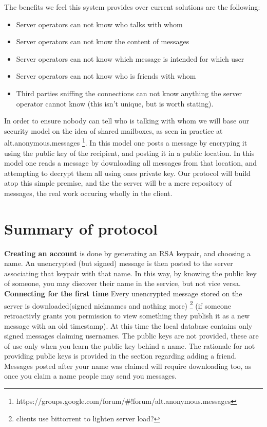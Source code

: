 The benefits we feel this system provides over current solutions are the
following:
\begin{itemize}
\item Server operators can not know who talks with whom
\item Server operators can not know the content of messages
\item Server operators can not know which message is intended for which user
\item Server operators can not know who is friends with whom
\item Third parties sniffing the connections can not know anything the server
operator cannot know (this isn't unique, but is worth stating).
\end{itemize}

In order to ensure nobody can tell who is talking with whom we will base our
security model on the idea of shared mailboxes, as seen in practice at
alt.anonymous.messages
\footnote{https://groups.google.com/forum/\#!forum/alt.anonymous.messages}.
In this model one posts a message by encryping it using the public key of the
recipient, and posting it in a public location. In this model one reads a
message by downloading all messages from that location, and attempting to
decrypt them all using ones private key. Our protocol will build atop this
simple premise, and the the server will be a mere repository of messages, the
real work occuring wholly in the client.

\section{Summary of protocol} 
\textbf{Creating an account} is done by generating an RSA keypair, and choosing
a name. An unencrypted (but signed) message is then posted to the server
associating that keypair with that name. In this way, by knowing the public key
of someone, you may discover their name in the service, but not vice versa.\\

\textbf{Connecting for the first time} Every unencrypted message stored on the
server is downloaded(signed nicknames and nothing more) \footnote{clients use
bittorrent to lighten server load?} (if someone retroactivly grants you
permission to view something they publish it as a new message with an old
timestamp). At this time the local database contains only signed messages
claiming usernames. The public keys are not provided, these are of use only when
you learn the public key behind a name. The rationale for not providing public
keys is provided in the section regarding adding a friend. Messages posted
after your name was claimed will require downloading too, as once you claim a
name people may send you messages.\\


